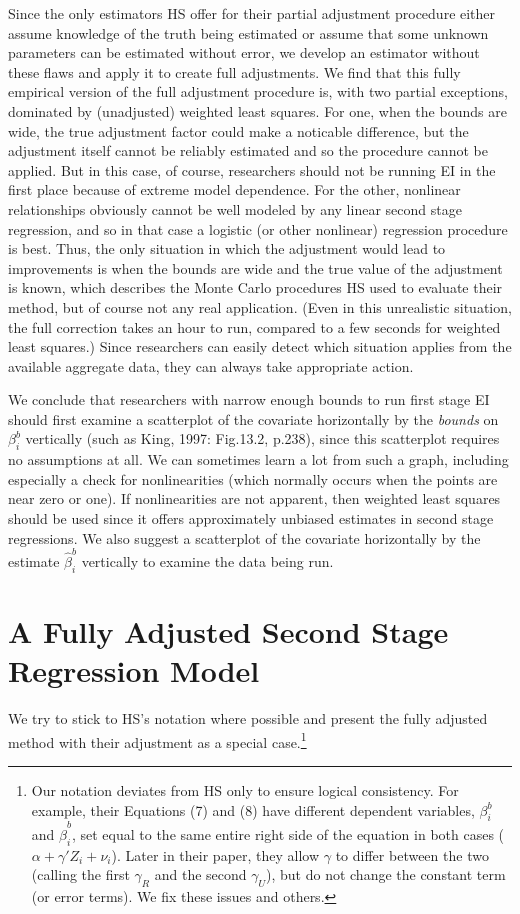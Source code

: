\documentclass[11pt,titlepage]{article}
\begin{document}
Since the only estimators HS offer for their partial adjustment
procedure either assume knowledge of the truth being estimated or
assume that some unknown parameters can be estimated without error, we
develop an estimator without these flaws and apply it to create full
adjustments.  We find that this fully empirical version of the full
adjustment procedure is, with two partial exceptions, dominated by
(unadjusted) weighted least squares.  For one, when the bounds are
wide, the true adjustment factor could make a noticable difference,
but the adjustment itself cannot be reliably estimated and so the
procedure cannot be applied.  But in this case, of course, researchers
should not be running EI in the first place because of extreme model
dependence.  For the other, nonlinear relationships obviously cannot
be well modeled by any linear second stage regression, and so in that
case a logistic (or other nonlinear) regression procedure is best.
Thus, the only situation in which the adjustment would lead to
improvements is when the bounds are wide and the true value of the
adjustment is known, which describes the Monte Carlo procedures HS
used to evaluate their method, but of course not any real application.
(Even in this unrealistic situation, the full correction takes an hour
to run, compared to a few seconds for weighted least squares.)  Since
researchers can easily detect which situation applies from the
available aggregate data, they can always take appropriate action.

We conclude that researchers with narrow enough bounds to run first
stage EI should first examine a scatterplot of the covariate
horizontally by the \emph{bounds} on $\beta_i^b$ vertically (such as
King, 1997: Fig.13.2, p.238), since this scatterplot requires no
assumptions at all.  We can sometimes learn a lot from such a graph,
including especially a check for nonlinearities (which normally occurs
when the points are near zero or one).  If nonlinearities are not
apparent, then weighted least squares should be used since it offers
approximately unbiased estimates in second stage regressions.  We also
suggest a scatterplot of the covariate horizontally by the estimate
$\hat\beta_i^b$ vertically to examine the data being run.

\section{A Fully Adjusted Second Stage Regression Model}
\label{s:fulladj}

We try to stick to HS's notation where possible and present the fully
adjusted method with their adjustment as a special case.\footnote{Our
  notation deviates from HS only to ensure logical consistency.  For
  example, their Equations (7) and (8) have different dependent
  variables, $\beta_i^b$ and $\hat\beta_i^b$, set equal to the same
  entire right side of the equation in both cases
  ($\alpha+\gamma'Z_i+\nu_i$).  Later in their paper, they allow
  $\gamma$ to differ between the two (calling the first $\gamma_R$ and
  the second $\gamma_U$), but do not change the constant term (or
  error terms).  We fix these issues and others.}
\end{document}
